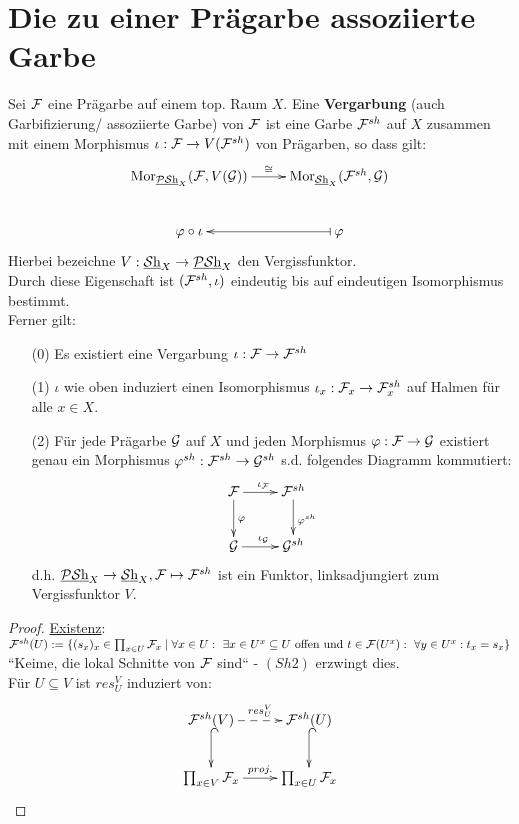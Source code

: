 \section{Die zu einer Prägarbe assoziierte Garbe}
\label{sec:vergarbung}

\begin{defn}
\label{def:vergarbung}
Sei $\mathcal{F}$ eine Prägarbe auf einem top. Raum $X$. Eine \textbf{Vergarbung} (auch Garbifizierung/ assoziierte Garbe) von $\mathcal{F}$ ist eine Garbe $\mathcal{F}^{sh}$ auf $X$ zusammen mit einem Morphismus $\iota : \mathcal{F} \to V(\mathcal{F}^{sh})$ von Prägarben, so dass gilt:\\
\[\xymatrix{  
\Mor_{\psh_{X}}(\sheaf{F}, V(\sheaf{G})) \ar^-\cong@{->}[r] & \Mor_{\sh_{X}}(\sheaf{F}^{sh}, \sheaf{G})  \\
\varphi \circ \iota & \ar@{|->}[l] \varphi
}\] Hierbei bezeichne $V : \operatorname{\underline{\mathcal{S}h}}_{X} \to \operatorname{\underline{\mathcal{PS}h}}_{X}$ den Vergissfunktor.\\
Durch diese Eigenschaft ist $(\mathcal{F}^{sh}, \iota)$ eindeutig bis auf eindeutigen Isomorphismus bestimmt.\\
Ferner gilt:
\begin{enumerate}
	\item[(0)] Es existiert eine Vergarbung $\iota : \mathcal{F} \to \mathcal{F}^{sh}$
	\item[(1)] $\iota$ wie oben induziert einen Isomorphismus $\iota_x : \mathcal{F}_x \to \mathcal{F}^{sh}_x$ auf Halmen für alle $x\in X$.
	\item[(2)] Für jede Prägarbe $\mathcal{G}$ auf $X$ und jeden Morphismus $\varphi: \mathcal{F} \to \mathcal{G}$ existiert genau ein Morphismus $\varphi^{sh}: \mathcal{F}^{sh} \to \mathcal{G}^{sh}$ s.d. folgendes Diagramm kommutiert:
	\[
	\xymatrix
	{
	\sheaf{F} \ar^{\iota_{\sheaf{F}}}@{->}[r] \ar^{\varphi}@{->}[d] & \sheaf{F}^{sh} \ar^{\varphi^{sh}}@{->}[d] \\
	\sheaf{G} \ar^{\iota_{\sheaf{G}}}@{->}[r] & \sheaf{G}^{sh}
    }
	\] d.h. $\operatorname{\underline{\mathcal{PS}h}}_{X} \to \operatorname{\underline{\mathcal{S}h}}_{X}, \mathcal{F} \mapsto \mathcal{F}^{sh}$ ist ein Funktor, linksadjungiert zum Vergissfunktor $V$.
\end{enumerate}
\end{defn}
\begin{proof}
\underline{Existenz}:\\
$\mathcal{F}^{sh}(U) := \{ (s_x)_{x} \in \prod_{x \in U} \mathcal{F}_{x} \mid \forall x \in U: \ \exists x \in U^x \subseteq U \text{ offen und } t \in \mathcal{F}(U^x): \ \forall y \in U^x: t_x = s_x \}$\\
``Keime, die lokal Schnitte von $\mathcal{F}$ sind`` - $(Sh2)$ erzwingt dies.\\
Für $U \subseteq V$ ist $res^V_U$ induziert von:\\
\[
\xymatrix
{
\sheaf{F}^{sh}(V) \ar^-{res^V_U}@{-->}[r] \ar@{^{(}->}[d] & \sheaf{F}^{sh}(U) \ar@{^{(}->}[d] \\
\prod_{x\in V} \sheaf{F}_x \ar^-{proj.}@{->}[r] & \prod_{x\in U}\sheaf{F}_x
}
\]
\end{proof}